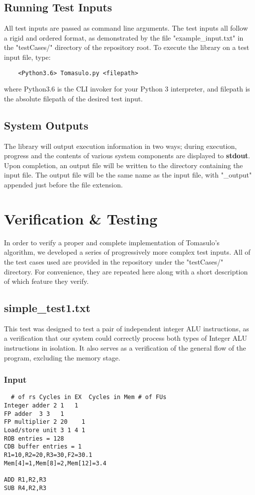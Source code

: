 \documentclass[12pt]{article}
\begin{document}
\subsection{Running Test Inputs}
All test inputs are passed as command line arguments.  The test inputs all follow a rigid and ordered format, as demonstrated by the file "example\_input.txt" in the "testCases/" directory of the repository root.  To execute the library on a test input file, type:
\begin{verbatim}
    <Python3.6> Tomasulo.py <filepath>
\end{verbatim}
where Python3.6 is the CLI invoker for your Python 3 interpreter, and filepath is the absolute filepath of the desired test input.

\subsection{System Outputs}
The library will output execution information in two ways; during execution, progress and the contents of various system components are displayed to \textbf{stdout}.  Upon completion, an output file will be written to the directory containing the input file.  The output file will be the same name as the input file, with "\_output" appended just before the file extension.

\section{Verification \& Testing}
In order to verify a proper and complete implementation of Tomasulo's algorithm, we developed a series of progressively more complex test inputs.  All of the test cases used are provided in the repository under the "testCases/" directory.  For convenience, they are repeated here along with a short description of which feature they verify.

\subsection{simple\_test1.txt}
This test was designed to test a pair of independent integer ALU instructions, as a verification that our system could correctly process both types of Integer ALU instructions in isolation.  It also serves as a verification of the general flow of the program, excluding the memory stage.

\subsubsection*{Input}
\begin{verbatim}
  # of rs Cycles in EX  Cycles in Mem # of FUs
Integer adder 2 1   1
FP adder  3 3   1
FP multiplier 2 20    1
Load/store unit 3 1 4 1
ROB entries = 128
CDB buffer entries = 1
R1=10,R2=20,R3=30,F2=30.1
Mem[4]=1,Mem[8]=2,Mem[12]=3.4

ADD R1,R2,R3
SUB R4,R2,R3
\end{verbatim}
\end{document}

